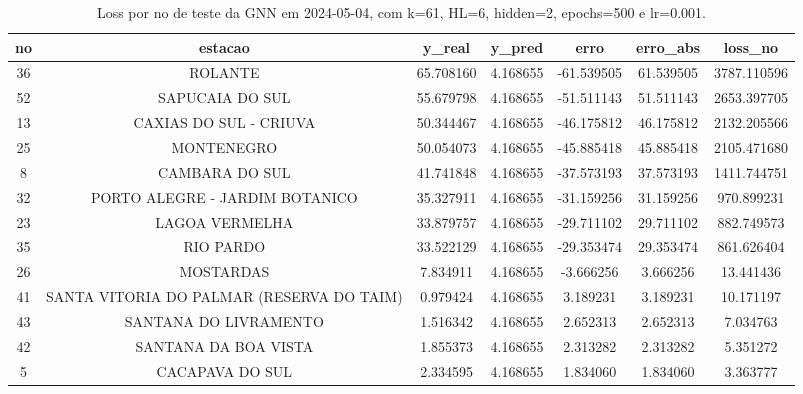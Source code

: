 \begin{table}[h]
\centering
\caption{Loss por no de teste da GNN em 2024-05-04, com k=61, HL=6, hidden=2, epochs=500 e lr=0.001.}
\label{tab:gnn_loss_k61_hl6_h2_e500_d20240504}
\begin{tabular}{ccccccc}
\toprule
no & estacao & y\_real & y\_pred & erro & erro\_abs & loss\_no \\
\midrule
36 & ROLANTE & 65.708160 & 4.168655 & -61.539505 & 61.539505 & 3787.110596 \\
52 & SAPUCAIA DO SUL & 55.679798 & 4.168655 & -51.511143 & 51.511143 & 2653.397705 \\
13 & CAXIAS DO SUL - CRIUVA & 50.344467 & 4.168655 & -46.175812 & 46.175812 & 2132.205566 \\
25 & MONTENEGRO & 50.054073 & 4.168655 & -45.885418 & 45.885418 & 2105.471680 \\
8 & CAMBARA DO SUL & 41.741848 & 4.168655 & -37.573193 & 37.573193 & 1411.744751 \\
32 & PORTO ALEGRE - JARDIM BOTANICO & 35.327911 & 4.168655 & -31.159256 & 31.159256 & 970.899231 \\
23 & LAGOA VERMELHA & 33.879757 & 4.168655 & -29.711102 & 29.711102 & 882.749573 \\
35 & RIO PARDO & 33.522129 & 4.168655 & -29.353474 & 29.353474 & 861.626404 \\
26 & MOSTARDAS & 7.834911 & 4.168655 & -3.666256 & 3.666256 & 13.441436 \\
41 & SANTA VITORIA DO PALMAR (RESERVA DO TAIM) & 0.979424 & 4.168655 & 3.189231 & 3.189231 & 10.171197 \\
43 & SANTANA DO LIVRAMENTO & 1.516342 & 4.168655 & 2.652313 & 2.652313 & 7.034763 \\
42 & SANTANA DA BOA VISTA & 1.855373 & 4.168655 & 2.313282 & 2.313282 & 5.351272 \\
5 & CACAPAVA DO SUL & 2.334595 & 4.168655 & 1.834060 & 1.834060 & 3.363777 \\
\bottomrule
\end{tabular}
\end{table}
